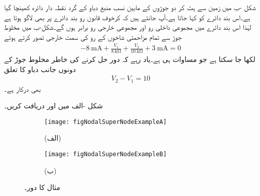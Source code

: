 شکل  -ب میں زمین سے ہٹ کر دو جوڑوں کے مابین نسب منبع دباو کے گرد نقطہ دار دائرہ کھینچا گیا ہے۔اس بند دائرے کو  کہا جاتا ہے۔آپ جانتے ہیں کہ کرخوف قانون رو بند دائرے پر بھی لاگو ہوتا ہے لہٰذا اس بند دائرے میں مجموعی داخلی رو اور مجموعی خارجی رو برابر ہوں گے۔شکل-ب میں مخلوط جوڑ سے تمام مزاحمتی شاخوں کے رو کی سمت خارجی تصور کرتے ہوئے
\begin{align}
-\SI{8}{\milli\ampere}+\frac{V_1}{\SI{8}{\kilo\ohm}}+\frac{V_2}{\SI{10}{\kilo\ohm}}+\SI{3}{\milli\ampere}=0
\end{align}
لکھا جا سکتا ہے جو مساوات   ہی ہے۔یاد رہے کہ دور حل کرنے کی خاطر مخلوط جوڑ کے دونوں جانب دباو کا تعلق
\begin{align}
V_2-V_1=10
\end{align}
بھی درکار ہے۔

شکل -الف میں  اور  دریافت کریں۔
\begin{figure}
\centering
\begin{subfigure}{1\textwidth}
\centering
\texttt{[image: figNodalSuperNodeExampleA]}
\caption*{(الف)}
\end{subfigure}
\begin{subfigure}{1\textwidth}
\centering
\texttt{[image: figNodalSuperNodeExampleB]}
\caption*{(ب)}
\end{subfigure}
\caption{مثال  کا دور۔}
\label{شکل_جوڑ_مثال_مخلوط_جوڑ_ب}
\end{figure}%

